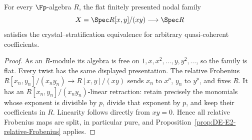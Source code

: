 \begin{corollary}\label{cor:DE-E2-relative-node}
For every $\Fp$-algebra $R$, the flat finitely presented nodal family
\[
                    X=\Spec R[x,y]/(xy)\longrightarrow\Spec R
\]
satisfies the crystal--stratification equivalence for arbitrary quasi-coherent coefficients.
\end{corollary}
\begin{proof}
As an $R$-module its algebra is free on $1,x,x^2,\ldots,y,y^2,\ldots$, so the family is flat.  Every twist has the same displayed presentation.  The relative Frobenius $R[x_n,y_n]/(x_ny_n)\to R[x,y]/(xy)$ sends $x_n$ to $x^p$, $y_n$ to $y^p$, and fixes $R$.  It has an $R[x_n,y_n]/(x_ny_n)$-linear retraction: retain precisely the monomials whose exponent is divisible by $p$, divide that exponent by $p$, and keep their coefficients in $R$.  Linearity follows directly from $xy=0$.  Hence all relative Frobenius maps are split, in particular pure, and Proposition~\ref{prop:DE-E2-relative-Frobenius} applies.
\end{proof}
